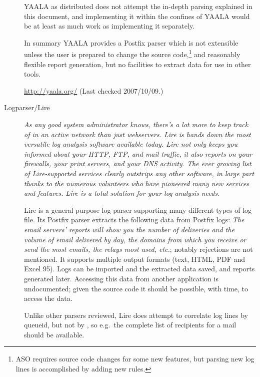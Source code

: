 \documentclass[a4paper,12pt,draft]{article}
\newcommand{\parsername}{ASO}
\begin{document}
\begin{description}
        YAALA as distributed does not attempt the in-depth parsing
        explained in this document, and implementing it within the confines
        of YAALA would be at least as much work as implementing it
        separately.

        In summary YAALA provides a Postfix parser which is not extensible
        unless the user is prepared to change the source
        code,\footnote{\parsername{} requires source code changes for some
        new features, but parsing new log lines is accomplished by adding
        new rules.} and reasonably flexible report generation, but no
        facilities to extract data for use in other tools.

        \url{http://yaala.org/} \newline (Last checked 2007/10/09.)

    \item [Logparser/Lire] \textit{As any good system administrator knows,
        there's a lot more to keep track of in an active network than just
        webservers. Lire is hands down the most versatile log analysis
        software available today. Lire not only keeps you informed about
        your HTTP, FTP, and mail traffic, it also reports on your
        firewalls, your print servers, and your DNS activity. The ever
        growing list of Lire-supported services clearly outstrips any other
        software, in large part thanks to the numerous volunteers who have
        pioneered many new services and features. Lire is a total solution
        for your log analysis needs.\/}

        Lire is a general purpose log parser supporting many different
        types of log file.  Its Postfix parser extracts the following data
        from Postfix logs: \textit{The email servers' reports will show you
        the number of deliveries and the volume of email delivered by day,
        the domains from which you receive or send the most emails, the
        relays most used, etc.\/}; notably rejections are not mentioned.
        It supports multiple output formats (text, HTML, PDF and Excel 95).
        Logs can be imported and the extracted data saved, and reports
        generated later.  Accessing this data from another application is
        undocumented; given the source code it should be possible, with
        time, to access the data.

        Unlike other parsers reviewed, Lire does attempt to correlate log
        lines by queueid, but not by \pid{}, so e.g.\ the complete list of
        recipients for a mail should be available.


\end{description}
\end{document}
